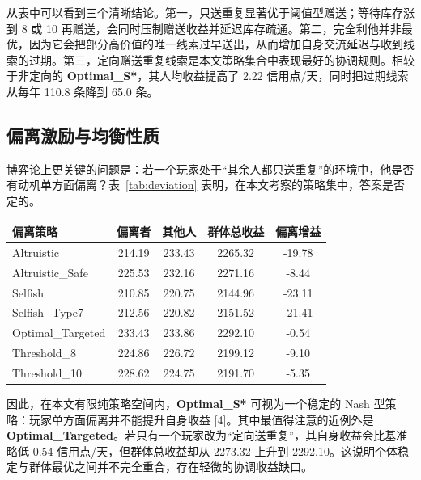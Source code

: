 \documentclass{rubbish}
\begin{document}
\begin{rubbishbody}
从表中可以看到三个清晰结论。第一，只送重复显著优于阈值型赠送；等待库存涨到 8 或 10 再赠送，会同时压制赠送收益并延迟库存疏通。第二，完全利他并非最优，因为它会把部分高价值的唯一线索过早送出，从而增加自身交流延迟与收到线索的过期。第三，定向赠送重复线索是本文策略集合中表现最好的协调规则。相较于非定向的 \textbf{Optimal\_S*}，其人均收益提高了 2.22 信用点/天，同时把过期线索从每年 110.8 条降到 65.0 条。

\subsection{偏离激励与均衡性质}

博弈论上更关键的问题是：若一个玩家处于“其余人都只送重复”的环境中，他是否有动机单方面偏离？表~\ref{tab:deviation} 表明，在本文考察的策略集中，答案是否定的。

\noindent
\begin{minipage}{\columnwidth}
\label{tab:deviation}
\vspace{2pt}
\centering
\small
\begin{tabular}{@{}lcccc@{}}
  \toprule
  \textbf{偏离策略} & \textbf{偏离者} & \textbf{其他人} & \textbf{群体总收益} & \textbf{偏离增益} \\
  \midrule
  Altruistic        & 214.19 & 233.43 & 2265.32 & -19.78 \\
  Altruistic\_Safe  & 225.53 & 232.16 & 2271.16 & -8.44 \\
  Selfish           & 210.85 & 220.75 & 2144.96 & -23.11 \\
  Selfish\_Type7    & 212.56 & 220.82 & 2151.52 & -21.41 \\
  Optimal\_Targeted & 233.43 & 233.86 & 2292.10 & -0.54 \\
  Threshold\_8      & 224.86 & 226.72 & 2199.12 & -9.10 \\
  Threshold\_10     & 228.62 & 224.75 & 2191.70 & -5.35 \\
  \bottomrule
\end{tabular}
\end{minipage}

因此，在本文有限纯策略空间内，\textbf{Optimal\_S*} 可视为一个稳定的 Nash 型策略：玩家单方面偏离并不能提升自身收益 [4]。其中最值得注意的近例外是 \textbf{Optimal\_Targeted}。若只有一个玩家改为“定向送重复”，其自身收益会比基准略低 0.54 信用点/天，但群体总收益却从 2273.32 上升到 2292.10。这说明个体稳定与群体最优之间并不完全重合，存在轻微的协调收益缺口。


\end{rubbishbody}
\end{document}
